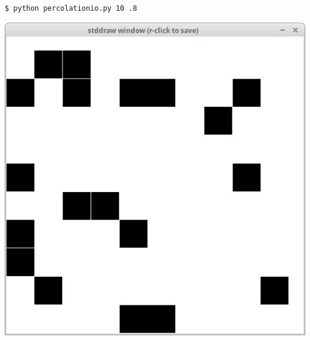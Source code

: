 \documentclass[8pt,a4paper,compress,handout]{beamer}
\begin{document}
\begin{frame}[fragile]
\begin{minipage}{160pt}
\begin{lstlisting}[language={}]
$ python percolationio.py 10 .8
\end{lstlisting}
\end{minipage}%
\begin{minipage}{140pt}
\hfill \includegraphics[scale=0.15]{figures/percolation1.png}
\end{minipage}

\smallskip


\end{frame}
\end{document}
